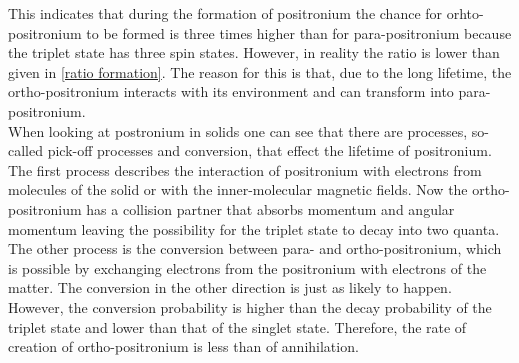 This indicates that during the formation of positronium the chance for orhto-positronium to be formed is three times higher than for para-positronium because the triplet state has three spin states. However, in reality the ratio is lower than given in \ref{ratio formation}. The reason for this is that, due to the long lifetime, the ortho-positronium interacts with its environment and can transform into para-positronium.\\
When looking at postronium in solids one can see that there are processes, so-called pick-off processes and conversion, that effect the lifetime of positronium. The first process describes the interaction of positronium with electrons from molecules of the solid or with the inner-molecular magnetic fields. Now the ortho-positronium has a collision partner that absorbs momentum and angular momentum leaving the possibility for the triplet state to decay into two quanta. The other process is the conversion between para- and ortho-positronium, which is possible by exchanging electrons from the positronium with electrons of the matter. The conversion in the other direction is just as likely to happen. However, the conversion probability is higher than the decay probability of the triplet state and lower than that of the singlet state. Therefore, the rate of creation of ortho-positronium is less than of annihilation. 